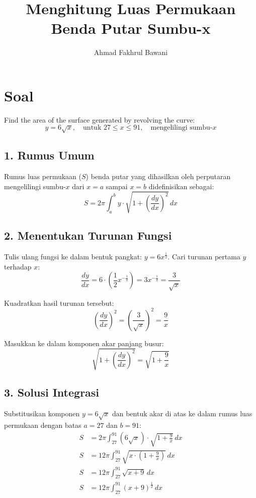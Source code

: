 \documentclass[12pt,a4paper]{article}
\title{Menghitung Luas Permukaan Benda Putar Sumbu-x}
\author{Ahmad Fakhrul Bawani}
\date{}
\begin{document}
\maketitle

\section*{Soal}

Find the area of the surface generated by revolving the curve:
\begin{equation*}
  y = 6\sqrt{x}, \quad \text{untuk } 27 \le x \le 91, \quad \text{mengelilingi sumbu-}x
\end{equation*}

\subsection*{1. Rumus Umum}
Rumus luas permukaan ($S$) benda putar yang dihasilkan oleh perputaran mengelilingi sumbu-$x$ dari $x = a$ sampai $x = b$ didefinisikan sebagai:
\begin{equation*}
  S = 2\pi \int_{a}^{b} y \cdot \sqrt{1 + \left(\frac{dy}{dx}\right)^2} \, dx
\end{equation*}

\subsection*{2. Menentukan Turunan Fungsi}
Tulis ulang fungsi ke dalam bentuk pangkat: $y = 6x^{\frac{1}{2}}$. Cari turunan pertama $y$ terhadap $x$:
\begin{equation*}
  \frac{dy}{dx} = 6 \cdot \left(\frac{1}{2}x^{-\frac{1}{2}}\right) = 3x^{-\frac{1}{2}} = \frac{3}{\sqrt{x}}
\end{equation*}

Kuadratkan hasil turunan tersebut:
\begin{equation*}
  \left(\frac{dy}{dx}\right)^2 = \left(\frac{3}{\sqrt{x}}\right)^2 = \frac{9}{x}
\end{equation*}

Masukkan ke dalam komponen akar panjang busur:
\begin{equation*}
  \sqrt{1 + \left(\frac{dy}{dx}\right)^2} = \sqrt{1 + \frac{9}{x}}
\end{equation*}

\subsection*{3. Solusi Integrasi}
Substitusikan komponen $y = 6\sqrt{x}$ dan bentuk akar di atas ke dalam rumus luas permukaan dengan batas $a = 27$ dan $b = 91$:
\begin{align*}
  S &= 2\pi \int_{27}^{91} (6\sqrt{x}) \cdot \sqrt{1 + \frac{9}{x}} \, dx \\
  S &= 12\pi \int_{27}^{91} \sqrt{x \cdot \left(1 + \frac{9}{x}\right)} \, dx \\
  S &= 12\pi \int_{27}^{91} \sqrt{x + 9} \, dx \\
  S &= 12\pi \int_{27}^{91} (x + 9)^{\frac{1}{2}} \, dx
\end{align*}
\end{document}
